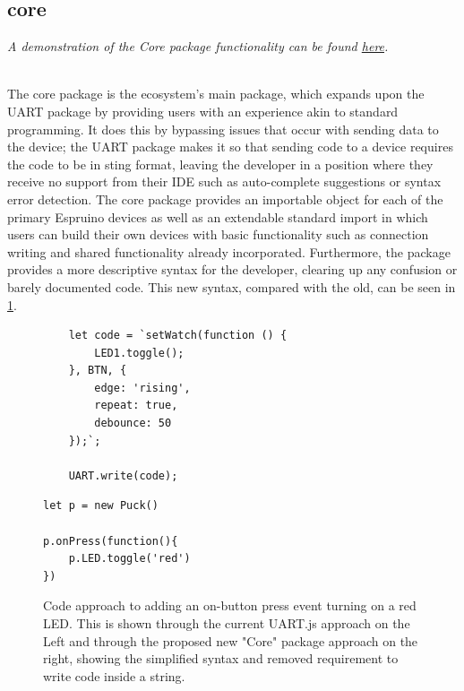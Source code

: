 \documentclass{l4proj}
\begin{document}
\subsection{core}
\begin{center}
\textit{A demonstration of the Core package functionality can be found \href{https://demos-mu.vercel.app/demo/light-sensor}{here}.}
\end{center}
\\
The core package is the ecosystem's main package, which expands upon the UART package by providing users with an experience akin to standard programming. It does this by bypassing issues that occur with sending data to the device; the UART package makes it so that sending code to a device requires the code to be in sting format, leaving the developer in a position where they receive no support from their IDE such as auto-complete suggestions or syntax error detection. The core package provides an importable object for each of the primary Espruino devices as well as an extendable standard import in which users can build their own devices with basic functionality such as connection writing and shared functionality already incorporated. Furthermore, the package provides a more descriptive syntax for the developer, clearing up any confusion or barely documented code. This new syntax, compared with the old, can be seen in \ref{fig:code_approach}.

\begin{figure}[!ht]
\centering
\begin{minipage}{6cm}
  \centering
  \begin{lstlisting}
    let code = `setWatch(function () {
        LED1.toggle();
    }, BTN, {
        edge: 'rising',
        repeat: true,
        debounce: 50
    });`;

    UART.write(code);
  \end{lstlisting}
\end{minipage}
\hspace{1cm}
\begin{minipage}{6cm}
  \centering
  
  \begin{lstlisting}
let p = new Puck()

p.onPress(function(){
    p.LED.toggle('red')
})
  \end{lstlisting}
\end{minipage}
  \caption{Code approach to adding an on-button press event turning on a red LED. This is shown through the current UART.js approach on the Left and through the proposed new "Core" package approach on the right, showing the simplified syntax and removed requirement to write code inside a string.}
  \label{fig:code_approach}
\end{figure}
\end{document}
